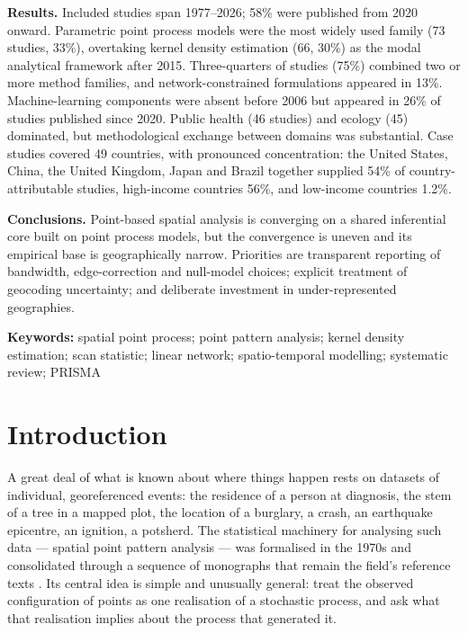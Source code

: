 \documentclass[11pt,a4paper]{article}
\begin{document}
\noindent
\textbf{Results.} Included studies span 1977--2026; 58\% were published from
2020 onward. Parametric point process models were the most widely used family
(73 studies, 33\%), overtaking kernel density estimation (66, 30\%) as the
modal analytical framework after 2015. Three-quarters of studies (75\%)
combined two or more method families, and network-constrained formulations
appeared in 13\%. Machine-learning components were absent before 2006 but
appeared in 26\% of studies published since 2020. Public health (46 studies)
and ecology (45) dominated, but methodological exchange between domains was
substantial. Case studies covered 49 countries, with pronounced concentration:
the United States, China, the United Kingdom, Japan and Brazil together
supplied 54\% of country-attributable studies, high-income countries 56\%, and
low-income countries 1.2\%.

\noindent
\textbf{Conclusions.} Point-based spatial analysis is converging on a shared
inferential core built on point process models, but the convergence is uneven
and its empirical base is geographically narrow. Priorities are transparent
reporting of bandwidth, edge-correction and null-model choices; explicit
treatment of geocoding uncertainty; and deliberate investment in
under-represented geographies.

\vspace{6pt}
\noindent\textbf{Keywords:} spatial point process; point pattern analysis;
kernel density estimation; scan statistic; linear network; spatio-temporal
modelling; systematic review; PRISMA

\newpage
\section{Introduction}

A great deal of what is known about where things happen rests on datasets of
individual, georeferenced events: the residence of a person at diagnosis, the
stem of a tree in a mapped plot, the location of a burglary, a crash, an
earthquake epicentre, an ignition, a potsherd. The statistical machinery for
analysing such data --- spatial point pattern analysis --- was formalised in
the 1970s \citep{ripley1977} and consolidated through a sequence of
monographs that remain the field's reference texts
\citep{diggle2013a,illian2008,baddeley2015,wiegand2013}. Its central idea is
simple and unusually general: treat the observed configuration of points as
one realisation of a stochastic process, and ask what that realisation implies
about the process that generated it.
\end{document}
